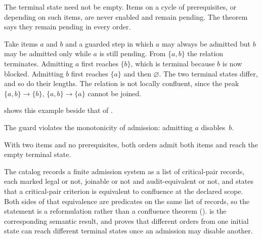 The terminal state need not be empty. Items on a cycle of prerequisites, or depending on
such items, are never enabled and remain pending. The theorem says they remain pending in
every order.

\begin{example}
\label{ex:disabling}
Take items $a$ and $b$ and a guarded step in which $a$ may always be admitted but $b$ may
be admitted only while $a$ is still pending. From $\{a,b\}$ the relation terminates.
Admitting $a$ first reaches $\{b\}$, which is terminal because $b$ is now blocked.
Admitting $b$ first reaches $\{a\}$ and then $\varnothing$. The two terminal states differ,
and so do their lengths. The relation is not locally confluent, since the peak
$\{a,b\}\to\{b\}$, $\{a,b\}\to\{a\}$ cannot be joined.
\end{example}

 shows this example beside that of .


The guard violates the monotonicity of admission: admitting $a$ disables~$b$.

\begin{example}
\label{ex:free-admission}
With two items and no prerequisites, both orders admit both items and reach the empty
terminal state.
\end{example}

The catalog records a finite admission system as a list of critical-pair records, each
marked legal or not, joinable or not and audit-equivalent or not, and states that a
critical-pair criterion is equivalent to confluence at the declared scope. Both sides of
that equivalence are predicates on the same list of records, so the statement is a
reformulation rather than a confluence theorem ().
 is the corresponding semantic result, and  proves
that different orders from one initial state can reach different terminal states once an
admission may disable another.
